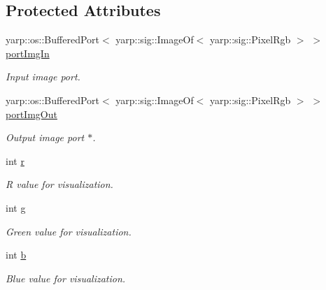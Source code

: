 \subsection*{Protected Attributes}
\begin{DoxyCompactItemize}
\item 
\mbox{\label{classSuperqVisualization_a567a3ef8af7cbd836fcd04c24c314243}} 
yarp\+::os\+::\+Buffered\+Port$<$ yarp\+::sig\+::\+Image\+Of$<$ yarp\+::sig\+::\+Pixel\+Rgb $>$ $>$ \mbox{\hyperlink{classSuperqVisualization_a567a3ef8af7cbd836fcd04c24c314243}{port\+Img\+In}}
\begin{DoxyCompactList}\small\item\em Input image port. \end{DoxyCompactList}\item 
\mbox{\label{classSuperqVisualization_a0ed5bf82e324579e781952b7a540d5c0}} 
yarp\+::os\+::\+Buffered\+Port$<$ yarp\+::sig\+::\+Image\+Of$<$ yarp\+::sig\+::\+Pixel\+Rgb $>$ $>$ \mbox{\hyperlink{classSuperqVisualization_a0ed5bf82e324579e781952b7a540d5c0}{port\+Img\+Out}}
\begin{DoxyCompactList}\small\item\em Output image port $\ast$. \end{DoxyCompactList}\item 
\mbox{\label{classSuperqVisualization_aee081a694340a9a8658a960872cb6172}} 
int \mbox{\hyperlink{classSuperqVisualization_aee081a694340a9a8658a960872cb6172}{r}}
\begin{DoxyCompactList}\small\item\em R value for visualization. \end{DoxyCompactList}\item 
\mbox{\label{classSuperqVisualization_a51cc6e3ac3ee243250a7042f00c813d1}} 
int \mbox{\hyperlink{classSuperqVisualization_a51cc6e3ac3ee243250a7042f00c813d1}{g}}
\begin{DoxyCompactList}\small\item\em Green value for visualization. \end{DoxyCompactList}\item 
\mbox{\label{classSuperqVisualization_a96c39287f863466bbbc21342dd62b68a}} 
int \mbox{\hyperlink{classSuperqVisualization_a96c39287f863466bbbc21342dd62b68a}{b}}
\begin{DoxyCompactList}\small\item\em Blue value for visualization. \end{DoxyCompactList}\item 
\mbox{\label{classSuperqVisualization_af984de33154bf4ebe0abf6f1f5047a1c}} 

\end{DoxyCompactItemize}
